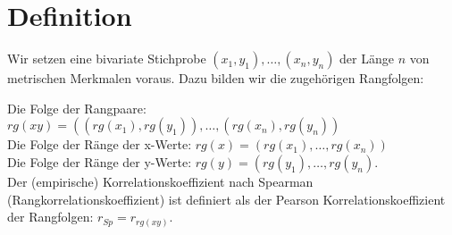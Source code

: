 \documentclass[10pt]{article}
\begin{document}
\section*{Definition}
Wir setzen eine bivariate Stichprobe $\left(x_{1}, y_{1}\right), \ldots,\left(x_{n}, y_{n}\right)$ der Länge $n$ von metrischen Merkmalen voraus. Dazu bilden wir die zugehörigen Rangfolgen:

Die Folge der Rangpaare: $r g(x y)=\left(\left(r g\left(x_{1}\right), r g\left(y_{1}\right)\right), \ldots,\left(r g\left(x_{n}\right), r g\left(y_{n}\right)\right)\right.$\\
Die Folge der Ränge der x-Werte: $r g(x)=\left(r g\left(x_{1}\right), \ldots, r g\left(x_{n}\right)\right)$\\
Die Folge der Ränge der y-Werte: $r g(y)=\left(r g\left(y_{1}\right), \ldots, r g\left(y_{n}\right)\right.$.\\
Der (empirische) Korrelationskoeffizient nach Spearman (Rangkorrelationskoeffizient) ist definiert als der Pearson Korrelationskoeffizient der Rangfolgen: $r_{S p}=r_{r g(x y)}$.
\end{document}
